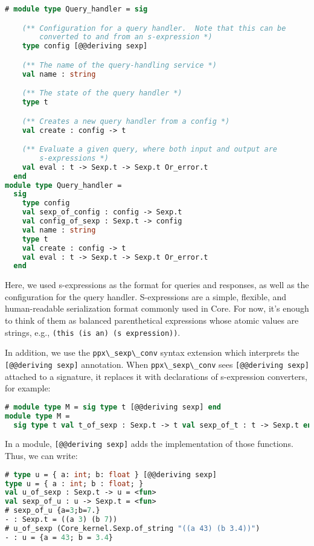 \begin{lstlisting}[language=Caml]
# module type Query_handler = sig

    (** Configuration for a query handler.  Note that this can be
        converted to and from an s-expression *)
    type config [@@deriving sexp]

    (** The name of the query-handling service *)
    val name : string

    (** The state of the query handler *)
    type t

    (** Creates a new query handler from a config *)
    val create : config -> t

    (** Evaluate a given query, where both input and output are
        s-expressions *)
    val eval : t -> Sexp.t -> Sexp.t Or_error.t
  end
module type Query_handler =
  sig
    type config
    val sexp_of_config : config -> Sexp.t
    val config_of_sexp : Sexp.t -> config
    val name : string
    type t
    val create : config -> t
    val eval : t -> Sexp.t -> Sexp.t Or_error.t
  end
\end{lstlisting}

Here, we used s-expressions as the format for queries and responses, as
well as the configuration for the query handler. S-expressions are a
simple, flexible, and human-readable serialization format commonly used
in Core. For now, it's enough to think of them as balanced parenthetical
expressions whose atomic values are strings, e.g.,
\passthrough{\lstinline!(this (is an) (s expression))!}.

In addition, we use the \passthrough{\lstinline!ppx\_sexp\_conv!} syntax
extension which interprets the
\passthrough{\lstinline![@@deriving sexp]!} annotation. When
\passthrough{\lstinline!ppx\_sexp\_conv!} sees
\passthrough{\lstinline![@@deriving sexp]!} attached to a signature, it
replaces it with declarations of s-expression converters, for
example:

\begin{lstlisting}[language=Caml]
# module type M = sig type t [@@deriving sexp] end
module type M =
  sig type t val t_of_sexp : Sexp.t -> t val sexp_of_t : t -> Sexp.t end
\end{lstlisting}

In a module, \passthrough{\lstinline![@@deriving sexp]!} adds the
implementation of those functions. Thus, we can write:

\begin{lstlisting}[language=Caml]
# type u = { a: int; b: float } [@@deriving sexp]
type u = { a : int; b : float; }
val u_of_sexp : Sexp.t -> u = <fun>
val sexp_of_u : u -> Sexp.t = <fun>
# sexp_of_u {a=3;b=7.}
- : Sexp.t = ((a 3) (b 7))
# u_of_sexp (Core_kernel.Sexp.of_string "((a 43) (b 3.4))")
- : u = {a = 43; b = 3.4}
\end{lstlisting}

